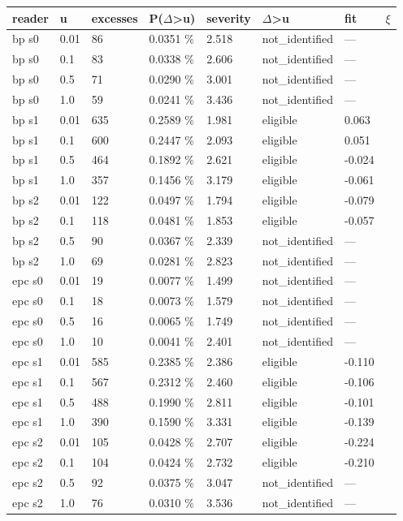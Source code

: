 \documentclass[10pt,a4paper]{article}
\begin{document}
\begin{center}\scriptsize
\begin{tabularx}{\textwidth}{@{}p{}XXXXXXX@{}}
\toprule
reader & u & excesses & P($\Delta$>u) & severity & $\Delta$>u & fit & $\xi$ \\ \midrule
bp s0 & 0.01 & 86 & 0.0351 \% & 2.518 & not\_identified & — &  \\
bp s0 & 0.1 & 83 & 0.0338 \% & 2.606 & not\_identified & — &  \\
bp s0 & 0.5 & 71 & 0.0290 \% & 3.001 & not\_identified & — &  \\
bp s0 & 1.0 & 59 & 0.0241 \% & 3.436 & not\_identified & — &  \\
bp s1 & 0.01 & 635 & 0.2589 \% & 1.981 & eligible & 0.063 &  \\
bp s1 & 0.1 & 600 & 0.2447 \% & 2.093 & eligible & 0.051 &  \\
bp s1 & 0.5 & 464 & 0.1892 \% & 2.621 & eligible & -0.024 &  \\
bp s1 & 1.0 & 357 & 0.1456 \% & 3.179 & eligible & -0.061 &  \\
bp s2 & 0.01 & 122 & 0.0497 \% & 1.794 & eligible & -0.079 &  \\
bp s2 & 0.1 & 118 & 0.0481 \% & 1.853 & eligible & -0.057 &  \\
bp s2 & 0.5 & 90 & 0.0367 \% & 2.339 & not\_identified & — &  \\
bp s2 & 1.0 & 69 & 0.0281 \% & 2.823 & not\_identified & — &  \\
epc s0 & 0.01 & 19 & 0.0077 \% & 1.499 & not\_identified & — &  \\
epc s0 & 0.1 & 18 & 0.0073 \% & 1.579 & not\_identified & — &  \\
epc s0 & 0.5 & 16 & 0.0065 \% & 1.749 & not\_identified & — &  \\
epc s0 & 1.0 & 10 & 0.0041 \% & 2.401 & not\_identified & — &  \\
epc s1 & 0.01 & 585 & 0.2385 \% & 2.386 & eligible & -0.110 &  \\
epc s1 & 0.1 & 567 & 0.2312 \% & 2.460 & eligible & -0.106 &  \\
epc s1 & 0.5 & 488 & 0.1990 \% & 2.811 & eligible & -0.101 &  \\
epc s1 & 1.0 & 390 & 0.1590 \% & 3.331 & eligible & -0.139 &  \\
epc s2 & 0.01 & 105 & 0.0428 \% & 2.707 & eligible & -0.224 &  \\
epc s2 & 0.1 & 104 & 0.0424 \% & 2.732 & eligible & -0.210 &  \\
epc s2 & 0.5 & 92 & 0.0375 \% & 3.047 & not\_identified & — &  \\
epc s2 & 1.0 & 76 & 0.0310 \% & 3.536 & not\_identified & — &  \\
\bottomrule
\end{tabularx}
\end{center}
\end{document}
